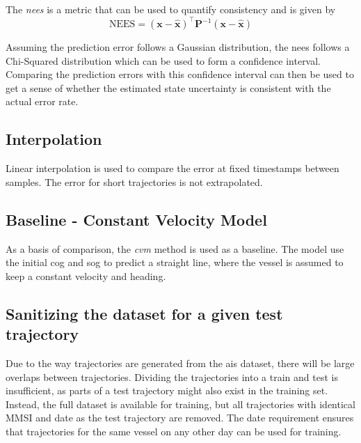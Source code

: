The \textit{\acrfull{nees}} is a metric that can be used to quantify consistency and is given by
\begin{equation}
    \text{NEES} = (\boldsymbol{x} - \hat{\boldsymbol{x}})^\intercal \boldsymbol{P}^{-1} (\boldsymbol{x} - \hat{\boldsymbol{x}})
\end{equation}

Assuming the prediction error follows a Gaussian distribution, the \acrshort{nees} follows a Chi-Squared distribution which can be used to form a confidence interval. Comparing the prediction errors with this confidence interval can then be used to get a sense of whether the estimated state uncertainty is consistent with the actual error rate.

\subsection{Interpolation}
Linear interpolation is used to compare the error at fixed timestamps between samples. The error for short trajectories is not extrapolated.

\subsection{Baseline - Constant Velocity Model}
As a basis of comparison, the \textit{\acrfull{cvm}} method is used as a baseline. The model use the initial \acrshort{cog} and \acrshort{sog} to predict a straight line, where the vessel is assumed to keep a constant velocity and heading.

\subsection{Sanitizing the dataset for a given test trajectory}
Due to the way trajectories are generated from the \acrshort{ais} dataset, there will be large overlaps between trajectories. Dividing the trajectories into a train and test is insufficient, as parts of a test trajectory might also exist in the training set. Instead, the full dataset is available for training, but all trajectories with identical MMSI and date as the test trajectory are removed. The date requirement ensures that trajectories for the same vessel on any other day can be used for training.

